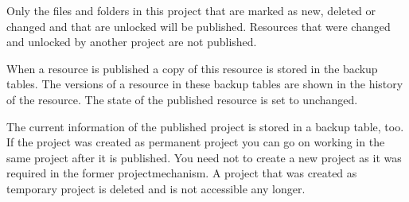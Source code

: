 Only the files and folders in this project that are marked as new,
deleted or changed and that are unlocked will be published.
Resources that were changed and unlocked by another project are
not published.

When a resource is published a copy of this resource is stored in
the backup tables. The versions of a resource in these backup
tables are shown in the  history of the resource.
The state of the published resource is set to unchanged.

The current information of the published project is stored in a
backup table, too. If the project was created as permanent project
you can go on working in the same project after it is published.
You need not to create a new project as it was required in the
former projectmechanism. A project that was created as temporary
project is deleted and is not accessible any longer.
